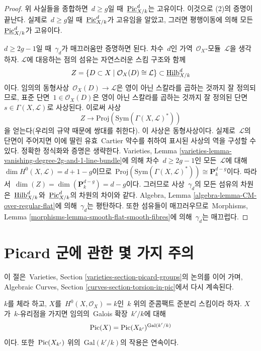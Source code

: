 \begin{proof}
\medskip\noindent
위 사실들을 종합하면\  $d \geq g$일 때\ 
$\underline{\mathrm{Pic}}^d_{X/k}$는 고유이다. 이것으로 (2)의 증명이
끝난다. 실제로\  $d \geq g$일 때\  $\underline{\mathrm{Pic}}^d_{X/k}$가
고유임을 알았고, 그러면 평행이동에 의해 모든\ 
$\underline{\mathrm{Pic}}^d_{X/k}$가 고유이다.

\medskip\noindent
$d \geq 2g - 1$일 때\  $\gamma_d$가 매끄러움만 증명하면 된다.
차수\  $d$인 가역\  $\mathcal{O}_X$-모듈\  $\mathcal{L}$을 생각하자.
$\mathcal{L}$에 대응하는 점의 섬유는 자연스러운 스킴 구조와 함께
$$
Z = \{D \subset X \mid \mathcal{O}_X(D) \cong \mathcal{L}\} \subset
\underline{\mathrm{Hilb}}^d_{X/k}
$$
이다. 임의의 동형사상\  $\mathcal{O}_X(D) \to \mathcal{L}$은 영이 아닌
스칼라를 곱하는 것까지 잘 정의되므로, 표준 단면\ 
$1 \in \mathcal{O}_X(D)$은 영이 아닌 스칼라를 곱하는 것까지 잘 정의된
단면\  $s \in \Gamma(X, \mathcal{L})$로 사상된다. 이로써 사상
$$
Z \longrightarrow
\text{Proj}(\text{Sym}(\Gamma(X, \mathcal{L})^*))
$$
을 얻는다(우리의 규약 때문에 쌍대를 취한다). 이 사상은 동형사상이다.
실제로\  $\mathcal{L}$의 단면이 주어지면 이에 딸린 유효\  Cartier 약수를
취하여 표시된 사상의 역을 구성할 수 있다. 정확한 정식화와 증명은
생략한다. Varieties, Lemma
\ref{varieties-lemma-vanishing-degree-2g-and-1-line-bundle}에 의해 차수\ 
$d \geq 2g - 1$인 모든\  $\mathcal{L}$에 대해\ 
$\dim H^0(X, \mathcal{L}) = d + 1 - g$이므로\ 
$\text{Proj}(\text{Sym}(\Gamma(X, \mathcal{L})^*))
\cong \mathbf{P}^{d - g}_k$이다. 따라서\ 
$\dim(Z) = \dim(\mathbf{P}^{d - g}_k) = d - g$이다.
그러므로 사상\  $\gamma_d$의 모든 섬유의 차원은\ 
$\underline{\mathrm{Hilb}}^d_{X/k}$와\ 
$\underline{\mathrm{Pic}}^d_{X/k}$의 차원의 차이와 같다.
Algebra, Lemma \ref{algebra-lemma-CM-over-regular-flat}에 의해\ 
$\gamma_d$는 평탄하다. 또한 섬유들이 매끄러우므로\  Morphisms, Lemma
\ref{morphisms-lemma-smooth-flat-smooth-fibres}에 의해\  $\gamma_d$는
매끄럽다.
\end{proof}





\section{Picard 군에 관한 몇 가지 주의}
\label{section-remarks-picard}

\noindent
이 절은\  Varieties, Section \ref{varieties-section-picard-groups}의 논의를
이어 가며, Algebraic Curves, Section \ref{curves-section-torsion-in-pic}에서
다시 계속된다.

\begin{lemma}
\label{lemma-pic-descends}
$k$를 체라 하고, $X$를\  $H^0(X, \mathcal{O}_X) = k$인\  $k$ 위의
준콤팩트 준분리 스킴이라 하자. $X$가\  $k$-유리점을 가지면 임의의\  Galois
확장\  $k'/k$에 대해
$$
\mathop{\mathrm{Pic}}\nolimits(X) = \mathop{\mathrm{Pic}}\nolimits(X_{k'})^{\text{Gal}(k'/k)}
$$
이다. 또한\  $\mathop{\mathrm{Pic}}\nolimits(X_{k'})$ 위의\  $\text{Gal}(k'/k)$의 작용은 연속이다.
\end{lemma}

